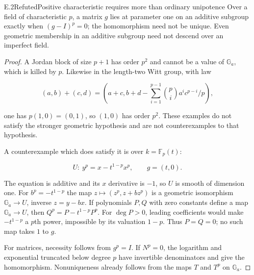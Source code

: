\begin{statement}{E.2}{Refuted}{Positive characteristic requires more than ordinary unipotence}
Over a field of characteristic $p$, a matrix $g$ lies at
parameter one on an additive subgroup exactly when
$(g-I)^p=0$; the homomorphism need not be unique.
Even geometric membership in an additive subgroup need
not descend over an imperfect field.
\end{statement}
\begin{proof}
A Jordan block of size $p+1$ has order $p^2$ and cannot
be a value of $\mathbb G_a$, which is killed by $p$.
Likewise in the length-two Witt group, with law

$$
(a,b)+(c,d)=
 \left(a+c,b+d-\sum_{i=1}^{p-1}\binom pi a^ic^{p-i}/p\right),
$$

one has $p(1,0)=(0,1)$, so $(1,0)$ has order $p^2$.
These examples do not satisfy the stronger geometric
hypothesis and are not counterexamples to that hypothesis.

A counterexample which does satisfy it is over
$k=\mathbb F_p(t)$:

$$
U:\ y^p=x-t^{1-p}x^p,\qquad g=(t,0).
$$

The equation is additive and its $x$ derivative is $-1$,
so $U$ is smooth of dimension one.
For $b^p=-t^{1-p}$ the map
$z\mapsto(z^p,z+bz^p)$ is a geometric isomorphism
$\mathbb G_a\to U$, inverse $z=y-bx$.
If polynomials $P,Q$ with zero constants define a map
$\mathbb G_a\to U$, then $Q^p=P-t^{1-p}P^p$.
For $\deg P>0$, leading coefficients would make
$-t^{1-p}$ a $p$th power, impossible by its valuation
$1-p$. Thus $P=Q=0$; no such map takes $1$ to $g$.

For matrices, necessity follows from $g^p=I$.
If $N^p=0$, the logarithm and exponential truncated
below degree $p$ have invertible denominators and give
the homomorphism. Nonuniqueness already follows from
the maps $T$ and $T^p$ on $\mathbb G_a$.
\end{proof}

